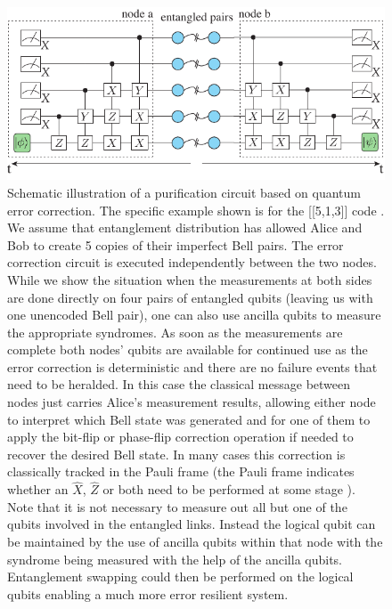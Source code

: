\documentclass[twocolumn, aps, rmp, amsmath, amssymb, nofootinbib, superscriptaddress, longbibliography, floatfix, table-of-contents, eqsecnum]{revtex4-1}
\newcommand{\comment}[1]{{\color{blue}{\textbf{#1}}}}
\begin{document}
\begin{figure}[!htb]
\includegraphics[width=\textwidth]{repeaters_7}
\caption{\comment{Redo fig} Schematic illustration of a purification circuit based on quantum error correction. The specific example shown is for the [[5,1,3]] code \cite{bib:Bennettr1996a, bib:Knill97}. We assume that entanglement distribution has allowed Alice and Bob to create 5 copies of their imperfect Bell pairs. The error correction circuit is executed independently between the two nodes. While we show the situation when the measurements at both sides are done directly on four pairs of entangled qubits (leaving us with one unencoded Bell pair), one can also use ancilla qubits to measure the appropriate syndromes. As soon as the measurements are complete both nodes' qubits are available for continued use as the error correction is deterministic and there are no failure events that need to be heralded. In this case the classical message between nodes just carries Alice's measurement results, allowing either node to interpret which Bell state was generated and for one of them to apply the bit-flip or phase-flip correction operation if needed to recover the desired Bell state. In many cases this correction is classically tracked in the Pauli frame (the Pauli frame indicates whether an $\hat{X}$, $\hat{Z}$ or both need to be performed at some stage \cite{bib:jiang09, bib:munro10}). Note that it is not necessary to measure out all but one of the qubits involved in the entangled links. Instead the logical qubit can be maintained by the use of ancilla qubits within that node with the syndrome being measured with the help of the ancilla qubits. Entanglement swapping could then be performed on the logical qubits enabling a much more error resilient system.
}
\label{fig:repeaters_7}
\end{figure} 
\end{document}
